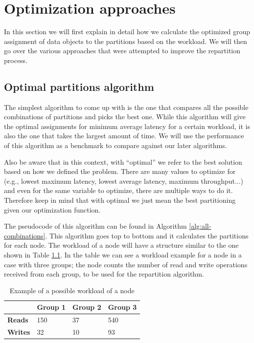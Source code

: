 \chapter{Optimization approaches}\label{sec:optimization-approaches}
In this section we will first explain in detail how we calculate the optimized group assignment of data objects to the partitions based on the workload. We will then go over the various approaches that were attempted to improve the repartition process. 

\section{Optimal partitions algorithm}\label{sec:optimal-partitions-algorithm} 
The simplest algorithm to come up with is the one that compares all the possible combinations of partitions and picks the best one. While this algorithm will give the optimal assignments for minimum average latency for a certain workload, it is also the one that takes the largest amount of time. We will use the performance of this algorithm as a benchmark to compare against our later algorithms.

Also be aware that in this context, with ``optimal'' we refer to the best solution based on how we defined the problem. There are many values to optimize for (e.g., lowest maximum latency, lowest average latency, maximum throughput...) and even for the same variable to optimize, there are multiple ways to do it. Therefore keep in mind that with optimal we just mean the best partitioning given our optimization function.

The pseudocode of this algorithm can be found in Algorithm \ref{alg:all-combinations}. This algorithm goes top to bottom and it calculates the partitions for each node. The workload of a node will have a structure similar to the one shown in Table \ref{tab:workload-example}. In the table we can see a workload example for a node in a case with three groups; the node counts the number of read and write operations received from each group, to be used for the repartition algorithm.

\begin{table}[!htb]
  \centering
  \begin{tabular}{l l l l}
    \hline
    & \textbf{Group 1} & \textbf{Group 2} & \textbf{Group 3} \\
    \hline
    \textbf{Reads} & 150 & 37 & 540 \\
    \textbf{Writes} & 32 & 10 & 93 \\
    \hline
  \end{tabular}
  \caption{Example of a possible workload of a node}\label{tab:workload-example}
\end{table}

